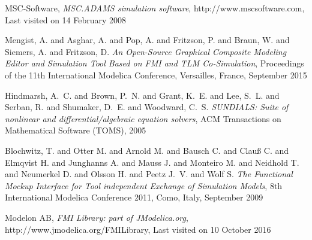 \begin{thebibliography}{14}
 MSC-Software,
	{\em MSC.ADAMS simulation software},
	http://www.mscsoftware.com, 
	Last visited on 14 February 2008
	
 Mengist, A. and Asghar, A. and Pop, A. and Fritzson, P. and Braun, W. and Siemers, A. and Fritzson, D.
	 {\em An Open-Source Graphical Composite Modeling Editor and Simulation Tool Based on {FM}I and {TLM} Co-Simulation},
		Proceedings of the 11th International Modelica Conference, Versailles, France, September 2015

 Hindmarsh, A.~C. and Brown, P.~N. and Grant, K.~E. and Lee, S.~L. and Serban, R. and Shumaker, D.~E. and Woodward, C.~S.
    {\em {SUNDIALS}: Suite of nonlinear and differential/algebraic equation solvers},
    ACM Transactions on Mathematical Software (TOMS), 2005

 Blochwitz, T. and Otter M. and Arnold M. and Bausch C. and Clau{\ss} C. and Elmqvist H. and Junghanns A. and Mauss J. and Monteiro M. and Neidhold T. and Neumerkel D. and Olsson H. and Peetz J.~V. and Wolf S.
    {\em The {Functional Mockup Interface} for Tool independent Exchange of Simulation Models},
	8th International Modelica Conference 2011, Como, Italy, September 2009

 Modelon AB,
{\em FMI Library: part of JModelica.org},
http://www.jmodelica.org/FMILibrary, 
Last visited on 10 October 2016


\end{thebibliography}
